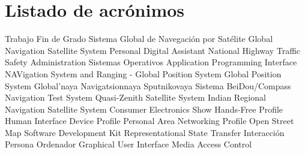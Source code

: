 \chapter{Listado de acrónimos}

{\small
\begin{acronym}[XXXXXXXX]
       {Trabajo Fin de Grado}
      {Sistema Global de Navegación por Satélite}
      {Global Navigation Satellite System}
       {Personal Digital Assistant}
     {National Highway Traffic Safety Administration}
        {Sistemas Operativos}
       {Application Programming Interface}
   {NAVigation System and Ranging - Global Position System}
       {Global Position System}
   {Global'naya Navigatsionnaya Sputnikovaya Sistema}
      {BeiDou/Compass Navigation Test System}
      {Quasi-Zenith Satellite System} 
     {Indian Regional Navigation Satellite System}
       {Consumer Electronics Show}
       {Hands-Free Profile}
       {Human Interface Device Profile}
       {Personal Area Networking Profile}
       {Open Street Map}
       {Software Development Kit}
      {Representational State Transfer}
       {Interacción Persona Ordenador}
       {Graphical User Interface}
       {Media Access Control}
\end{acronym}
}





